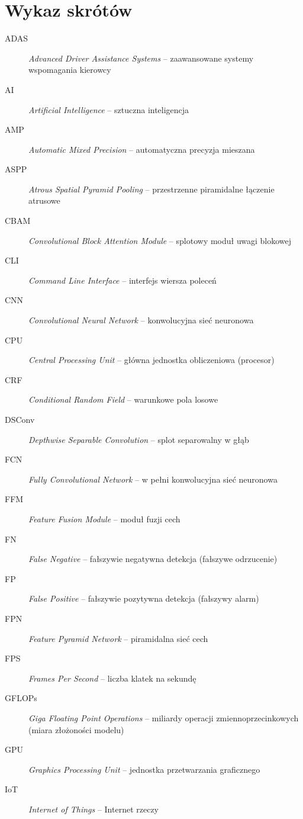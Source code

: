 \documentclass[final,a4paper,openany,12pt]{mwbk}
\begin{document}
\chapter*{Wykaz skrótów}
\begin{description}
    \item[ADAS] \textit{Advanced Driver Assistance Systems} -- zaawansowane systemy wspomagania kierowcy
    \item[AI] \textit{Artificial Intelligence} -- sztuczna inteligencja
    \item[AMP] \textit{Automatic Mixed Precision} -- automatyczna precyzja mieszana
    \item[ASPP] \textit{Atrous Spatial Pyramid Pooling} -- przestrzenne piramidalne łączenie atrusowe
    \item[CBAM] \textit{Convolutional Block Attention Module} -- splotowy moduł uwagi blokowej
    \item[CLI] \textit{Command Line Interface} -- interfejs wiersza poleceń
    \item[CNN] \textit{Convolutional Neural Network} -- konwolucyjna sieć neuronowa
    \item[CPU] \textit{Central Processing Unit} -- główna jednostka obliczeniowa (procesor)
    \item[CRF] \textit{Conditional Random Field} -- warunkowe pola losowe
    \item[DSConv] \textit{Depthwise Separable Convolution} -- splot separowalny w głąb
    \item[FCN] \textit{Fully Convolutional Network} -- w pełni konwolucyjna sieć neuronowa
    \item[FFM] \textit{Feature Fusion Module} -- moduł fuzji cech
    \item[FN] \textit{False Negative} -- fałszywie negatywna detekcja (fałszywe odrzucenie)
    \item[FP] \textit{False Positive} -- fałszywie pozytywna detekcja (fałszywy alarm)
    \item[FPN] \textit{Feature Pyramid Network} -- piramidalna sieć cech
    \item[FPS] \textit{Frames Per Second} -- liczba klatek na sekundę
    \item[GFLOPs] \textit{Giga Floating Point Operations} -- miliardy operacji zmiennoprzecinkowych (miara złożoności modelu)
    \item[GPU] \textit{Graphics Processing Unit} -- jednostka przetwarzania graficznego
    \item[IoT] \textit{Internet of Things} -- Internet rzeczy

\end{description}
\end{document}
